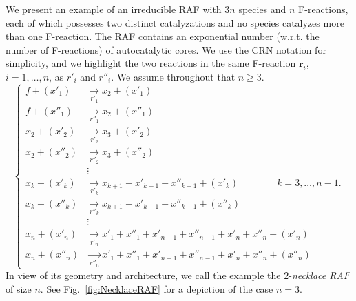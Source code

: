\documentclass[pdflatex]{sn-jnl}
\theoremstyle{thmstyleone}%
\theoremstyle{examplesty}%
\theoremstyle{thmstylethree}%
\newcommand{\fr}[0]{\mathbf{r}}
\begin{document}
We present an example of an irreducible RAF with $3n$ species and $n$
F-reactions, each of which possesses two distinct catalyzations and no
species catalyzes more than one F-reaction. The RAF contains an exponential number (w.r.t. the number of F-reactions) of autocatalytic cores. We use the CRN notation for simplicity, and we
highlight the two reactions in the same F-reaction $\fr_i$, $i=1,\dots,n$,
as $r'_i$ and $r''_i$. We assume throughout that $n\geq 3$.
\begin{equation*}
  \begin{cases}
    f + (x'_1) &
    \underset{r'_1}{\longrightarrow} x_2 + (x'_1)  \\
    f + (x''_1) &
    \underset{r''_1}{\longrightarrow} x_2 + (x''_1)  \\
    x_2 + (x'_2) &
    \underset{r'_2}{\longrightarrow} x_3 + (x'_2)  \\
    x_2 + (x''_2) &
    \underset{r''_2}{\longrightarrow} x_3 + (x''_2)  \\
    &\vdots\\
    x_k + (x'_k) &
    \underset{r'_k}{\longrightarrow}
    x_{k+1} + x'_{k-1} + x''_{k-1} + (x'_k) \qquad\qquad k=3,\ldots,n-1. \\
    x_k + (x''_k) &
    \underset{r''_k}{\longrightarrow}
    x_{k+1} + x'_{k-1} + x''_{k-1} + (x''_k)  \\
    &\vdots\\
    x_n + (x'_n) &
    \underset{r'_n}{\longrightarrow}
    x'_1 + x''_1 + x'_{n-1} + x''_{n-1}
    + x'_n + x''_n + (x'_n)  \\
    x_n + (x''_n) &
    \underset{r''_n}{\longrightarrow}
    x'_1 + x''_1 + x'_{n-1} + x''_{n-1}
    + x'_n + x''_n + (x''_n)
  \end{cases}
\end{equation*}
In view of its geometry and architecture, we call the example the
$2$-\emph{necklace RAF} of size $n$. See
Fig.~\ref{fig:NecklaceRAF} for a depiction of the case $n=3$.
\end{document}
